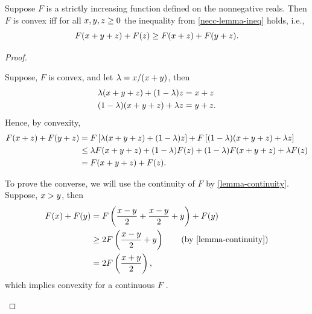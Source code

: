 \begin{lem}
	Suppose $F$ is a strictly increasing function defined on the nonnegative reals. Then $F$ is convex iff for all $x, y, z \geq 0$ the inequality from \cref{necc-lemma-ineq} holds, i.e.,
	$$F(x + y + z) + F(z) \geq F(x + z) + F(y + z).$$

	\begin{proof}

		\begin{proofpart}[$\Rightarrow$]
			Suppose, $F$ is convex, and let $\lambda = x / (x + y)$, then
			\begin{align*}
				\lambda(x + y + z) + (1 - \lambda)z   & = x + z  \\
				(1 - \lambda)(x + y + z) +  \lambda z & = y + z.
			\end{align*}
			Hence, by convexity,
      {\small \begin{align*}
				F(x + z) + F(y + z) & = F \left[ \lambda (x + y + z) + (1 - \lambda) z \right] + F \left[ (1 - \lambda) (x + y + z) + \lambda z \right] \\
				                            & \leq \lambda F(x + y + z) + (1 - \lambda) F(z) + (1 - \lambda) F(x + y + z) + \lambda F(z)                        \\
				                            & = F(x + y + z) + F(z).
    \end{align*}}
		\end{proofpart}

		\begin{proofpart}[$\Leftarrow$]
			To prove the converse, we will use the continuity of $F$ by \cref{lemma-continuity}. Suppose, $x > y$, then
			\begin{align*}
				F(\aa) + F(\bb) & = F \left( \frac{\aa - \bb}{2} + \frac{\aa - \bb}{2} + \bb \right) + F(\bb)        \\
				                & \geq 2 F \left( \frac{\aa - \bb}{2} + \bb \right) \tag{by \cref{lemma-continuity}} \\
				                & = 2 F \left( \frac{\aa + \bb}{2} \right),
			\end{align*}
			which implies convexity for a continuous $F$ \parencite[p. 51, Exercise 6]{lecturesConvGeo}.
		\end{proofpart}
	\end{proof}
\end{lem}


